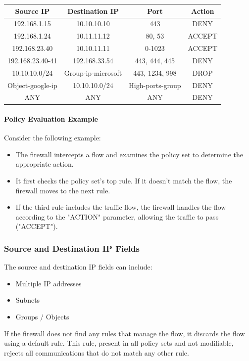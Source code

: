 \begin{longtable}{|c|c|c|c|}
\hline
\textbf{Source IP} & \textbf{Destination IP} & \textbf{Port} & \textbf{Action} \\
\hline
192.168.1.15 & 10.10.10.10 & 443 & DENY \\ \hline
192.168.1.24 & 10.11.11.12 & 80, 53 & ACCEPT \\ \hline
192.168.23.40 & 10.10.11.11 & 0-1023 & ACCEPT \\\hline
192.168.23.40-41 & 192.168.33.54 & 443, 444, 445 & DENY \\\hline
10.10.10.0/24 & Group-ip-microsoft & 443, 1234, 998 & DROP \\\hline
Object-google-ip & 10.10.10.0/24 & High-ports-group & DENY \\\hline
ANY & ANY & ANY & DENY \\
\hline
\end{longtable}

\paragraph{Policy Evaluation Example}

Consider the following example:

\begin{itemize}
    \item The firewall intercepts a flow and examines the policy set to determine the appropriate action.
    \item It first checks the policy set's top rule. If it doesn't match the flow, the firewall moves to the next rule.
    \item If the third rule includes the traffic flow, the firewall handles the flow according to the "ACTION" parameter, allowing the traffic to pass ("ACCEPT").
\end{itemize}

\subsubsection{Source and Destination IP Fields}

The source and destination IP fields can include:
\begin{itemize}
    \item Multiple IP addresses
    \item Subnets
    \item Groups / Objects
\end{itemize}

If the firewall does not find any rules that manage the flow, it discards the flow using a default rule. This rule, present in all policy sets and not modifiable, rejects all communications that do not match any other rule.

